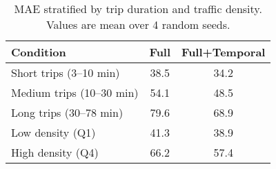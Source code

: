 \begin{table}[t]
\centering
\caption{MAE stratified by trip duration and traffic density. Values are mean over 4 random seeds.}
\label{tab:per-bin}
\begin{tabular}{lcc}
\toprule
Condition & Full & Full+Temporal \\
\midrule
Short trips (3--10 min) & 38.5 & 34.2 \\
Medium trips (10--30 min) & 54.1 & 48.5 \\
Long trips (30--78 min) & 79.6 & 68.9 \\
Low density (Q1) & 41.3 & 38.9 \\
High density (Q4) & 66.2 & 57.4 \\
\bottomrule
\end{tabular}
\end{table}
